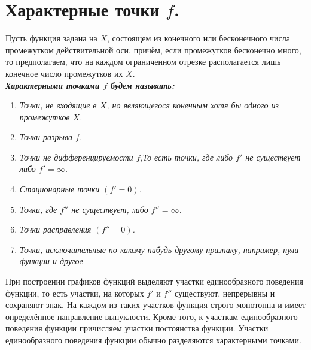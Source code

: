 \section{Характерные точки $f$.} 
Пусть функция задана на $X$, состоящем из конечного или бесконечного числа промежутком действительной оси, причём, если промежутков бесконечно много, то предполагаем, что на каждом ограниченном отрезке располагается лишь конечное число промежутков их $X$.\\
\textbf{\textit{Характерными точками $f$ будем называть:}}
\begin{enumerate}
	\item \textit
	{
		Точки, не входящие в $X$, но являющегося конечным хотя бы одного из промежутков $X$. 
	}
	\item \textit
	{
		Точки разрыва $f$. 
	}
	\item \textit
	{
		Точки не дифференцируемости $f$,То есть точки, где либо $f'$ не существует либо $f' = \infty$.
	}
	\item \textit
	{
		Стационарные точки $(f' = 0)$.
	}
	\item \textit
	{
		Точки, где $f''$ не существует, либо $f'' = \infty$. 
	}
	\item \textit
	{
		Точки расправления $(f'' = 0)$.
	}
	\item \textit
	{
		Точки, исключительные по какому-нибудь другому признаку, например, нули функции и другое
	}
\end{enumerate}
При построении графиков функций выделяют участки единообразного поведения функции, то есть участки, на которых $f'$ и $f''$ существуют, непрерывны и сохраняют знак. На каждом из таких участков функция строго монотонна и имеет определённое направление выпуклости. Кроме того, к участкам единообразного поведения функции причисляем участки постоянства функции. Участки единообразного поведения функции обычно разделяются характерными точками.
